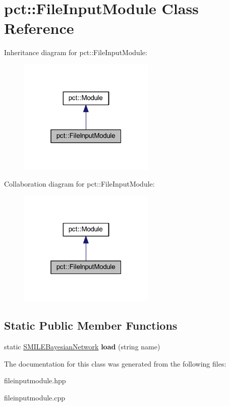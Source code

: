 \hypertarget{classpct_1_1_file_input_module}{\section{pct\-:\-:File\-Input\-Module Class Reference}
\label{classpct_1_1_file_input_module}
}


Inheritance diagram for pct\-:\-:File\-Input\-Module\-:\nopagebreak
\begin{figure}[H]
\begin{center}
\leavevmode
\includegraphics[width=184pt]{classpct_1_1_file_input_module__inherit__graph}
\end{center}
\end{figure}


Collaboration diagram for pct\-:\-:File\-Input\-Module\-:\nopagebreak
\begin{figure}[H]
\begin{center}
\leavevmode
\includegraphics[width=184pt]{classpct_1_1_file_input_module__coll__graph}
\end{center}
\end{figure}
\subsection*{Static Public Member Functions}
\begin{DoxyCompactItemize}
\item 
\hypertarget{classpct_1_1_file_input_module_ac8f804700eb906655dfdf550c1ba36c6}{static \hyperlink{classpct_1_1_s_m_i_l_e_bayesian_network}{S\-M\-I\-L\-E\-Bayesian\-Network} {\bfseries load} (string name)}\label{classpct_1_1_file_input_module_ac8f804700eb906655dfdf550c1ba36c6}

\end{DoxyCompactItemize}


The documentation for this class was generated from the following files\-:\begin{DoxyCompactItemize}
\item 
fileinputmodule.\-hpp\item 
fileinputmodule.\-cpp\end{DoxyCompactItemize}
